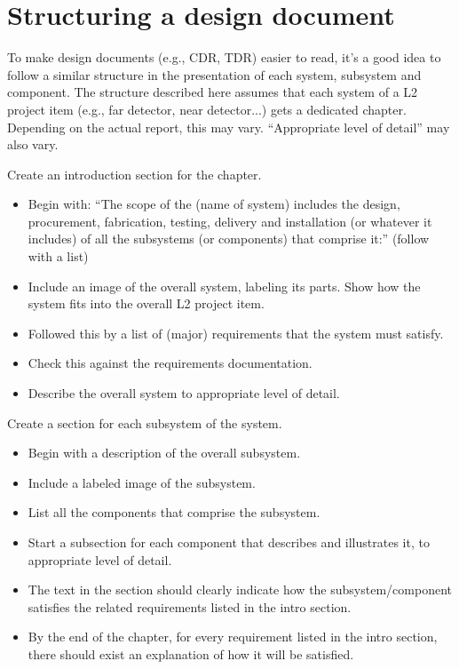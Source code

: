 \section{Structuring a design document}
\label{sec:design-doc}

To make design documents (e.g., CDR, TDR) easier to read, it's a good idea to follow a similar structure in the presentation of each system, subsystem and component. The structure described here assumes that each system of a L2 project item (e.g., far detector, near detector...) gets a dedicated chapter.  Depending on the actual report, this may vary. ``Appropriate level of detail'' may also vary.

Create an introduction section for the chapter.
\begin{itemize}
\item Begin with: ``The scope of the (name of system) includes the design, procurement, fabrication, testing, delivery and installation (or whatever it includes) of all the subsystems (or components) that comprise it:'' (follow with a list)
\item Include an image of the overall system, labeling its parts. Show how the system fits into the overall L2 project item.
\item Followed this by a list of (major) requirements that the system must satisfy.
\item Check this against the requirements documentation.
\item Describe the overall system to appropriate level of detail.
\end{itemize}

Create a section for each subsystem of the system.

\begin{itemize}
\item Begin with a description of the overall subsystem.
\item Include a labeled image of the subsystem.  
\item List all the components that comprise the subsystem.
\item Start a subsection for each component that describes and illustrates it, to appropriate level of detail.
\item The text in the section should clearly indicate how the subsystem/component satisfies the related requirements listed in the intro section.
\item By the end of the chapter, for every requirement listed in the intro section, there should exist an explanation of how it will be satisfied.
\end{itemize}
